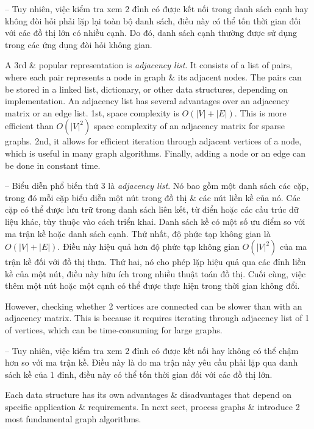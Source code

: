 \documentclass{article}
\begin{document}
\begin{itemize}
\begin{itemize}
\begin{itemize}
            -- Tuy nhiên, việc kiểm tra xem 2 đỉnh có được kết nối trong danh sách cạnh hay không đòi hỏi phải lặp lại toàn bộ danh sách, điều này có thể tốn thời gian đối với các đồ thị lớn có nhiều cạnh. Do đó, danh sách cạnh thường được sử dụng trong các ứng dụng đòi hỏi không gian.

            A 3rd \& popular representation is {\it adjacency list}. It consists of a list of pairs, where each pair represents a node in graph \& its adjacent nodes. The pairs can be stored in a linked list, dictionary, or other data structures, depending on implementation. An adjacency list has several advantages over an adjacency matrix or an edge list. 1st, space complexity is $O(|V| + |E|)$. This is more efficient than $O(|V|^2)$ space complexity of an adjacency matrix for sparse graphs. 2nd, it allows for efficient iteration through adjacent vertices of a node, which is useful in many graph algorithms. Finally, adding a node or an edge can be done in constant time.

            -- Biểu diễn phổ biến thứ 3 là {\it adjacency list}. Nó bao gồm một danh sách các cặp, trong đó mỗi cặp biểu diễn một nút trong đồ thị \& các nút liền kề của nó. Các cặp có thể được lưu trữ trong danh sách liên kết, từ điển hoặc các cấu trúc dữ liệu khác, tùy thuộc vào cách triển khai. Danh sách kề có một số ưu điểm so với ma trận kề hoặc danh sách cạnh. Thứ nhất, độ phức tạp không gian là $O(|V| + |E|)$. Điều này hiệu quả hơn độ phức tạp không gian $O(|V|^2)$ của ma trận kề đối với đồ thị thưa. Thứ hai, nó cho phép lặp hiệu quả qua các đỉnh liền kề của một nút, điều này hữu ích trong nhiều thuật toán đồ thị. Cuối cùng, việc thêm một nút hoặc một cạnh có thể được thực hiện trong thời gian không đổi.

            However, checking whether 2 vertices are connected can be slower than with an adjacency matrix. This is because it requires iterating through adjacency list of 1 of vertices, which can be time-consuming for large graphs.

            -- Tuy nhiên, việc kiểm tra xem 2 đỉnh có được kết nối hay không có thể chậm hơn so với ma trận kề. Điều này là do ma trận này yêu cầu phải lặp qua danh sách kề của 1 đỉnh, điều này có thể tốn thời gian đối với các đồ thị lớn.

            Each data structure has its own advantages \& disadvantages that depend on specific application \& requirements. In next sect, process graphs \& introduce 2 most fundamental graph algorithms.


\end{itemize}
\end{itemize}
\end{itemize}
\end{document}

